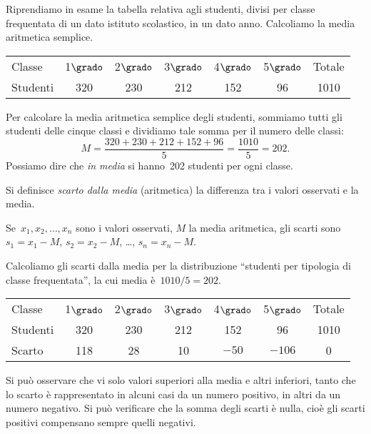  \begin{esempio}

Riprendiamo in esame la tabella relativa agli studenti, divisi per classe 
frequentata di un dato istituto scolastico, in un dato anno. Calcoliamo la 
media aritmetica semplice.
\begin{center}
 \begin{tabular}{lcccccc}
 \toprule
 Classe & 1\(\grado\) & 2\(\grado\) & 3\(\grado\) & 4\(\grado\) & 5\(\grado\) & 
Totale\\
 Studenti & 320 & 230 & 212 & 152 & 96 & 1010\\
 \bottomrule
\end{tabular}
\end{center}
Per calcolare la media aritmetica semplice degli studenti, sommiamo tutti 
gli studenti delle cinque classi e dividiamo tale somma per il numero delle 
classi:
\begin{equation*}
M=\frac{320+230+212+152+96}{5}= \frac{1010}{5}= 202.
\end{equation*}
Possiamo dire che \emph{in media} si hanno~202 studenti per ogni classe.

\begin{definizione}
Si definisce \emph{scarto dalla media} (aritmetica) la differenza tra i 
valori osservati e la media.
\end{definizione}

Se~\(x_1, x_2, \ldots, x_n\) sono i valori osservati, \(M\) la media 
aritmetica, gli scarti sono~\(s_1=x_1-M\), \(s_2=x_2-M\), \ldots, \(s_n=x_n-M\).
\end{esempio}

\begin{esempio}
Calcoliamo gli scarti dalla media per la distribuzione ``studenti per 
tipologia di classe frequentata'', la cui media è~\(1010/5 = 202\).
\begin{center}
\begin{tabular}{l*{6}{c}}
\toprule
Classe & 1\(\grado\) & 2\(\grado\) & 3\(\grado\) & 4\(\grado\) & 5\(\grado\) & 
Totale\\
Studenti & 320& 230& 212& 152& 96& 1010 \\
Scarto & 118 & 28 & 10 & \(-50\) & \(-106\) & 0\\
\bottomrule
\end{tabular}
\end{center}
Si può osservare che vi solo valori superiori alla media e altri inferiori, 
tanto che lo scarto è rappresentato in
alcuni casi da un numero positivo, in altri da un numero negativo. Si può 
verificare che la somma degli scarti è nulla,
cioè gli scarti positivi compensano sempre quelli negativi.
 \end{esempio}


